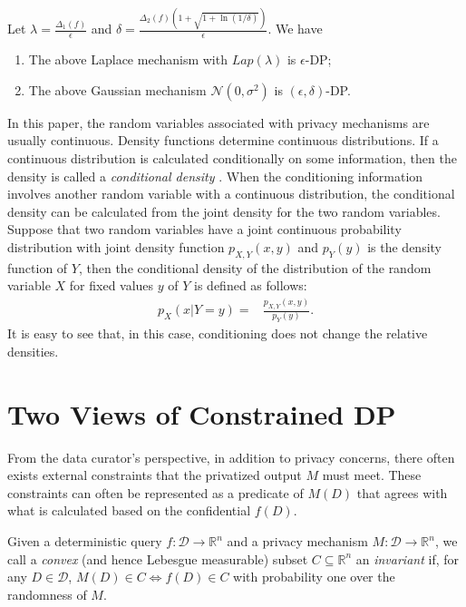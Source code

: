 \documentclass[11pt]{article}
\begin{document}
\begin{proposition}\cite{DworkMNS06} Let $\lambda = \frac{\Delta_1(f)}{\epsilon}$ and $\delta = \frac{\Delta_2(f) (1+ \sqrt{1+ \ln (1/\delta)})}{\epsilon}$. We have 
	\begin{enumerate}
		\item The above Laplace mechanism with $Lap(\lambda)$ is $\epsilon$-DP;
		\item The above Gaussian mechanism $\mathcal{N}(0, \sigma^2)$ is $(\epsilon, \delta)$-DP. 
	\end{enumerate}
\end{proposition}



In this paper, the random variables associated with privacy mechanisms are usually continuous. Density functions determine continuous distributions. If a continuous distribution is calculated conditionally on some information, then the density is
called a \emph{conditional density} \cite{Applebaum1996probability}. When the conditioning information involves
another random variable with a continuous distribution, the conditional density can be calculated from the joint density for the two random variables. Suppose that two random variables have a joint continuous probability distribution with joint density function $p_{X,Y}(x, y)$ and $p_Y(y)$ is the density function of $Y$, then  the conditional density  of the distribution of the random variable $X$ for fixed values $y$ of $Y$ is defined as follows:
	\begin{align}
		p_X( x | Y=y) = & \frac{p_{X, Y}(x,y)}{p_Y(y)}.
	\end{align}
It is easy to see that, in this case, conditioning does not change the relative densities.

\section{Two Views of Constrained DP}\label{sec:two-views}

From the data curator’s perspective, in addition to privacy
concerns, there often exists external constraints that the privatized output $M$ must meet.  These constraints can often be represented as a predicate of $M(D)$ that agrees with what is calculated based on the confidential $f(D)$. 

\begin{definition} \label{def:invariant} Given a deterministic query $f: \mathcal{D}\rightarrow \mathbb{R}^n$ and a privacy mechanism $M: \mathcal{D}\rightarrow \mathbb{R}^n$, we call a \emph{convex} (and hence Lebesgue measurable) subset  $C\subseteq \mathbb{R}^n$ an \emph{invariant} if, for any $D \in \mathcal{D}$, $M(D) \in C \Leftrightarrow  f(D)\in C$ with probability one over the randomness of $M$. 
\end{definition}
\end{document}
